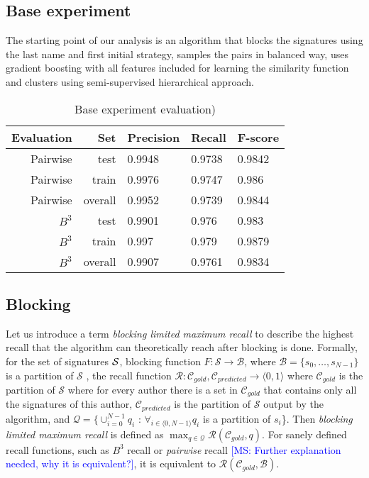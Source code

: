 \documentclass{article}
\newcommand{\msnote}[1]{\textcolor{blue}{[MS: #1]}}
\begin{document}

\subsection{Base experiment}

The starting point of our analysis is an algorithm that blocks the signatures using the last
name and first initial strategy, samples the pairs in balanced way, uses gradient boosting
with all features included for learning the similarity function and clusters using
semi-supervised hierarchical approach.

\FloatBarrier
\begin{table}[H]
\caption{Base experiment evaluation)}
\centering
\begin{tabular}{|r|r|l|l|l|}
  \hline
  Evaluation & Set & Precision & Recall & F-score \\
  \hline
  Pairwise & test & 0.9948 & 0.9738 & 0.9842 \\
  \hline
  Pairwise & train & 0.9976 & 0.9747 & 0.986 \\
  \hline
  Pairwise & overall & 0.9952 & 0.9739 & 0.9844 \\
  \hline
  $B^3$ & test & 0.9901 & 0.976 & 0.983 \\
  \hline
  $B^3$ & train & 0.997 & 0.979 & 0.9879 \\
  \hline
  $B^3$ & overall & 0.9907 & 0.9761 & 0.9834 \\
  \hline
\end{tabular}
\end{table}

\subsection{Blocking}

Let us introduce a term \textit{blocking limited maximum recall} to describe the highest
recall that the algorithm can theoretically reach after blocking is done.
Formally, for the set of signatures ${\cal S}$, blocking function $F: \mathcal{S}
\rightarrow \mathcal{B}$, where $ \mathcal{B} = \{s_{0}, \ldots{} , s_{N-1}\}$ is a
partition of $\mathcal{S} $ , the recall function $\mathcal{R}: \mathcal{C}_{gold},
\mathcal{C}_{predicted} \rightarrow \langle0,1\rangle$ where $\mathcal{C}_{gold}$ is the
partition of $\mathcal{S}$ where for every author there is a set in $\mathcal{C}_{gold}$
that contains only all the signatures of this author, $\mathcal{C}_{predicted}$ is the
partition of $\mathcal{S}$ output by the algorithm, and $\mathcal{Q} = \{\cup_{i=0}^{N-1}
q_i $ : $\forall_{i \in \langle0,N-1\rangle} q_i$ is a partition of $s_i$\}. Then
\textit{blocking limited maximum recall} is defined as $\max_{q \in \mathcal{Q}}
\mathcal{R}(\mathcal{C}_{gold}, q)$. For sanely defined recall functions, such as $B^{3}$
recall or \textit{pairwise} recall \msnote{Further explanation needed, why it is
equivalent?}, it is equivalent to $\mathcal{R}(\mathcal{C}_{gold}, \mathcal{B})$.
\end{document}
